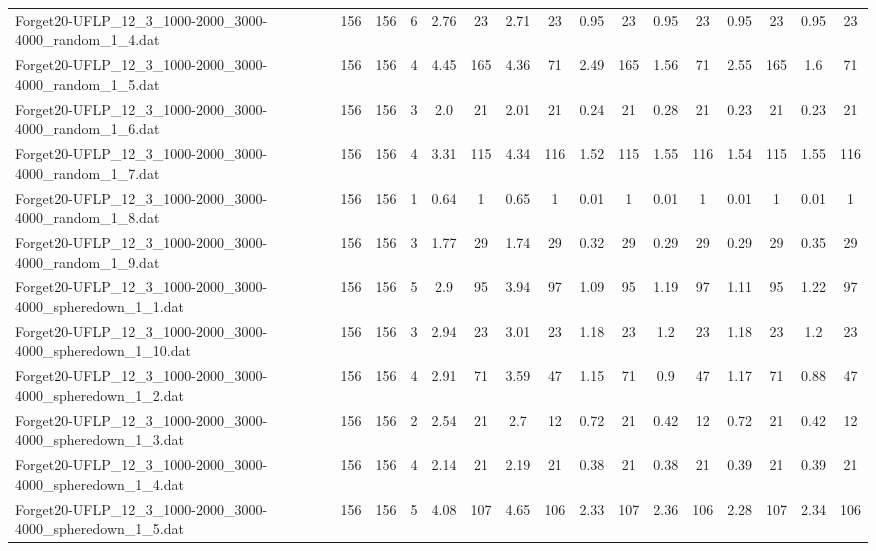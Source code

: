 \begin{sidewaystable}[!ht]
{\begin{tabular}{lccccccccccccccc}
Forget20-UFLP\_12\_3\_1000-2000\_3000-4000\_random\_1\_4.dat & 156 & 156 & 6 & 2.76 & 23 & 2.71 & 23 &  \textcolor{blue2}{0.95} & 23 &  \textcolor{blue2}{0.95} & 23 &  \textcolor{blue2}{0.95} & 23 &  \textcolor{blue2}{0.95} & 23 \\
Forget20-UFLP\_12\_3\_1000-2000\_3000-4000\_random\_1\_5.dat & 156 & 156 & 4 & 4.45 & 165 & 4.36 & 71 & 2.49 & 165 & 1.56 & 71 & 2.55 & 165 & 1.6 & 71 \\
Forget20-UFLP\_12\_3\_1000-2000\_3000-4000\_random\_1\_6.dat & 156 & 156 & 3 & 2.0 & 21 & 2.01 & 21 & 0.24 & 21 & 0.28 & 21 & 0.23 & 21 & 0.23 & 21 \\
Forget20-UFLP\_12\_3\_1000-2000\_3000-4000\_random\_1\_7.dat & 156 & 156 & 4 & 3.31 & 115 & 4.34 & 116 & 1.52 & 115 & 1.55 & 116 & 1.54 & 115 & 1.55 & 116 \\
Forget20-UFLP\_12\_3\_1000-2000\_3000-4000\_random\_1\_8.dat & 156 & 156 & 1 & 0.64 & 1 & 0.65 & 1 &  \textcolor{blue2}{0.01} & 1 &  \textcolor{blue2}{0.01} & 1 &  \textcolor{blue2}{0.01} & 1 &  \textcolor{blue2}{0.01} & 1 \\
Forget20-UFLP\_12\_3\_1000-2000\_3000-4000\_random\_1\_9.dat & 156 & 156 & 3 & 1.77 & 29 & 1.74 & 29 & 0.32 & 29 &  \textcolor{blue2}{0.29} & 29 &  \textcolor{blue2}{0.29} & 29 & 0.35 & 29 \\
Forget20-UFLP\_12\_3\_1000-2000\_3000-4000\_spheredown\_1\_1.dat & 156 & 156 & 5 & 2.9 & 95 & 3.94 & 97 & 1.09 & 95 & 1.19 & 97 & 1.11 & 95 & 1.22 & 97 \\
Forget20-UFLP\_12\_3\_1000-2000\_3000-4000\_spheredown\_1\_10.dat & 156 & 156 & 3 & 2.94 & 23 & 3.01 & 23 &  \textcolor{blue2}{1.18} & 23 & 1.2 & 23 &  \textcolor{blue2}{1.18} & 23 & 1.2 & 23 \\
Forget20-UFLP\_12\_3\_1000-2000\_3000-4000\_spheredown\_1\_2.dat & 156 & 156 & 4 & 2.91 & 71 & 3.59 & 47 & 1.15 & 71 & 0.9 & 47 & 1.17 & 71 & 0.88 & 47 \\
Forget20-UFLP\_12\_3\_1000-2000\_3000-4000\_spheredown\_1\_3.dat & 156 & 156 & 2 & 2.54 & 21 & 2.7 & 12 & 0.72 & 21 &  \textcolor{blue2}{0.42} & 12 & 0.72 & 21 &  \textcolor{blue2}{0.42} & 12 \\
Forget20-UFLP\_12\_3\_1000-2000\_3000-4000\_spheredown\_1\_4.dat & 156 & 156 & 4 & 2.14 & 21 & 2.19 & 21 &  \textcolor{blue2}{0.38} & 21 &  \textcolor{blue2}{0.38} & 21 & 0.39 & 21 & 0.39 & 21 \\
Forget20-UFLP\_12\_3\_1000-2000\_3000-4000\_spheredown\_1\_5.dat & 156 & 156 & 5 & 4.08 & 107 & 4.65 & 106 & 2.33 & 107 & 2.36 & 106 &  \textcolor{blue2}{2.28} & 107 & 2.34 & 106 \\

\end{tabular}}
\end{sidewaystable}
